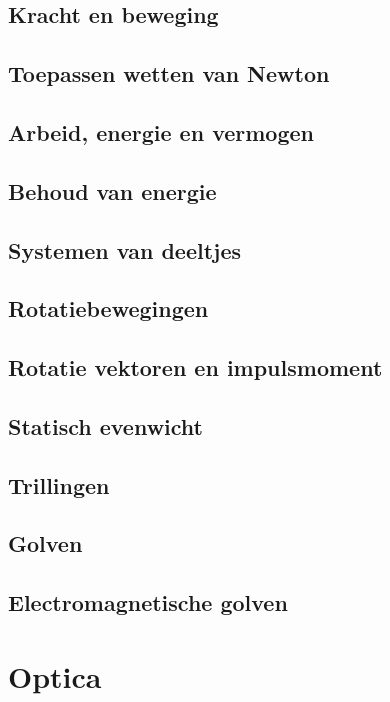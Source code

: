 \documentclass[12pt]{report}
\begin{document}
\chapter{Kracht en beweging}

\chapter{Toepassen wetten van Newton}

\chapter{Arbeid, energie en vermogen}

\chapter{Behoud van energie}

\chapter{Systemen van deeltjes}

\chapter{Rotatiebewegingen}

\chapter{Rotatie vektoren en impulsmoment}

\chapter{Statisch evenwicht}

\chapter{Trillingen}

\chapter{Golven}

\chapter{Electromagnetische golven}

\part{Optica}
\end{document}
